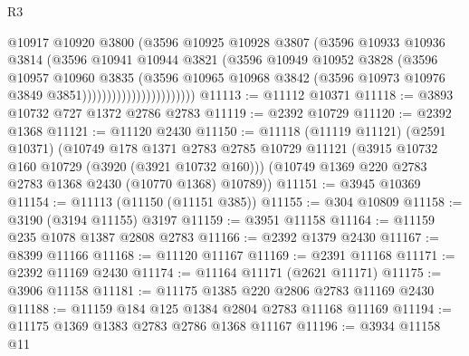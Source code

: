 \begin{lexlean}{R3}
\begin{coremodule}
                                    @10917
                                    @10920
                                    @3800
                                    (@3596
                                      @10925
                                      @10928
                                      @3807
                                      (@3596
                                        @10933
                                        @10936
                                        @3814
                                        (@3596
                                          @10941
                                          @10944
                                          @3821
                                          (@3596
                                            @10949
                                            @10952
                                            @3828
                                            (@3596
                                              @10957
                                              @10960
                                              @3835
                                              (@3596
                                                @10965
                                                @10968
                                                @3842
                                                (@3596
                                                  @10973
                                                  @10976
                                                  @3849
                                                  @3851)))))))))))))))))))))))
@11113 := @11112 @10371
@11118 := @3893 @10732 @727 @1372 @2786 @2783
@11119 := @2392 @10729
@11120 := @2392 @1368
@11121 := @11120 @2430
@11150 := @11118
    (@11119 @11121)
    (@2591 @10371)
    (@10749
      @178
      @1371
      @2783
      @2785
      @10729
      @11121
      (@3915 @10732 @160 @10729 (@3920 (@3921 @10732 @160)))
      (@10749 @1369 @220 @2783 @2783 @1368 @2430 (@10770 @1368) @10789))
@11151 := @3945 @10369
@11154 := @11113 (@11150 (@11151 @385))
@11155 := @304 @10809
@11158 := @3190 (@3194 @11155) @3197
@11159 := @3951 @11158
@11164 := @11159 @235 @1078 @1387 @2808 @2783
@11166 := @2392 @1379 @2430
@11167 := @8399 @11166
@11168 := @11120 @11167
@11169 := @2391 @11168
@11171 := @2392 @11169 @2430
@11174 := @11164 @11171 (@2621 @11171)
@11175 := @3906 @11158
@11181 := @11175 @1385 @220 @2806 @2783 @11169 @2430
@11188 := @11159 @184 @125 @1384 @2804 @2783 @11168 @11169
@11194 := @11175 @1369 @1383 @2783 @2786 @1368 @11167
@11196 := @3934 @11158 @11

\end{coremodule}
\end{lexlean}
